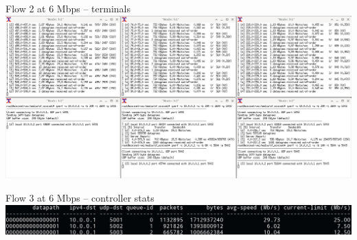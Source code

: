\documentclass[12pt,aspectratio=169]{beamer}
\begin{document}
\begin{frame}{Flow 2 at 6 Mbps -- terminals}
	\centering
	\includegraphics[width=\linewidth]{resources/screenshot-f2-6M-terminals.png}
\end{frame}
\begin{frame}{Flow 3 at 6 Mbps -- controller stats}
	\centering
	\includegraphics[width=\linewidth]{resources/screenshot-f2-6M-controllerstats.png}
\end{frame}

\end{document}

